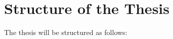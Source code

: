 \documentclass[12pt,twoside,doublepage]{article}
\begin{document}
 
 
 
 
\section{Structure of the Thesis}
\label{sec:structure}
 
The thesis will be structured as follows:
 
\end{document}
